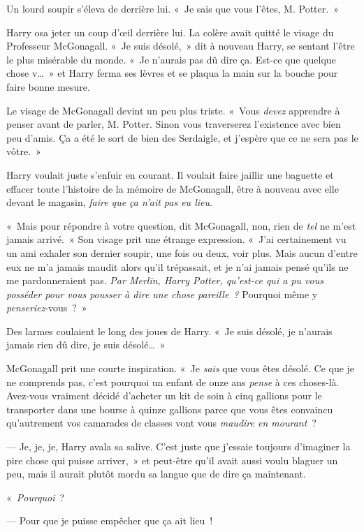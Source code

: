 Un lourd soupir s'éleva de derrière lui. «~Je sais que vous l'êtes, M. Potter.~»

Harry osa jeter un coup d'œil derrière lui. La colère avait quitté le visage du Professeur McGonagall. «~Je suis désolé,~» dit à nouveau Harry, se sentant l'être le plus misérable du monde. «~Je n'aurais pas dû dire ça. Est-ce que quelque chose v…~» et Harry ferma ses lèvres et se plaqua la main sur la bouche pour faire bonne mesure.

Le visage de McGonagall devint un peu plus triste. «~Vous \emph{devez} apprendre à penser avant de parler, M. Potter. Sinon vous traverserez l'existence avec bien peu d'amis. Ça a été le sort de bien des Serdaigle, et j'espère que ce ne sera pas le vôtre.~»

Harry voulait juste s'enfuir en courant. Il voulait faire jaillir une baguette et effacer toute l'histoire de la mémoire de McGonagall, être à nouveau avec elle devant le magasin, \emph{faire que ça n'ait pas eu lieu}.

«~Mais pour répondre à votre question, dit McGonagall, non, rien de \emph{tel} ne m'est jamais arrivé.~» Son visage prit une étrange expression. «~J'ai certainement vu un ami exhaler son dernier soupir, une fois ou deux, voir plus. Mais aucun d'entre eux ne m'a jamais maudit alors qu'il trépassait, et je n'ai jamais pensé qu'ils ne me pardonneraient pas. \emph{Par Merlin, Harry Potter, qu'est-ce qui a pu vous posséder pour vous pousser à dire une chose pareille~?} Pourquoi même y \emph{penseriez}-vous~?~»

Des larmes coulaient le long des joues de Harry. «~Je suis désolé, je n'aurais jamais rien dû dire, je suis désolé…~»

McGonagall prit une courte inspiration. «~Je \emph{sais} que vous êtes désolé. Ce que je ne comprends pas, c'est pourquoi un enfant de onze ans \emph{pense} à ces choses-là. Avez-vous vraiment décidé d'acheter un kit de soin à cinq gallions pour le transporter dans une bourse à quinze gallions parce que vous êtes convaincu qu'autrement vos camarades de classes vont vous \emph{maudire en mourant}~?

--- Je, je,  je, Harry avala sa salive. C'est juste que j'essaie toujours d'imaginer la pire chose qui puisse arriver,~» et peut-être qu'il avait aussi voulu blaguer un peu, mais il aurait plutôt mordu sa langue que de dire ça maintenant.

«~\emph{Pourquoi}~?

--- Pour que je puisse empêcher que ça ait lieu~!

